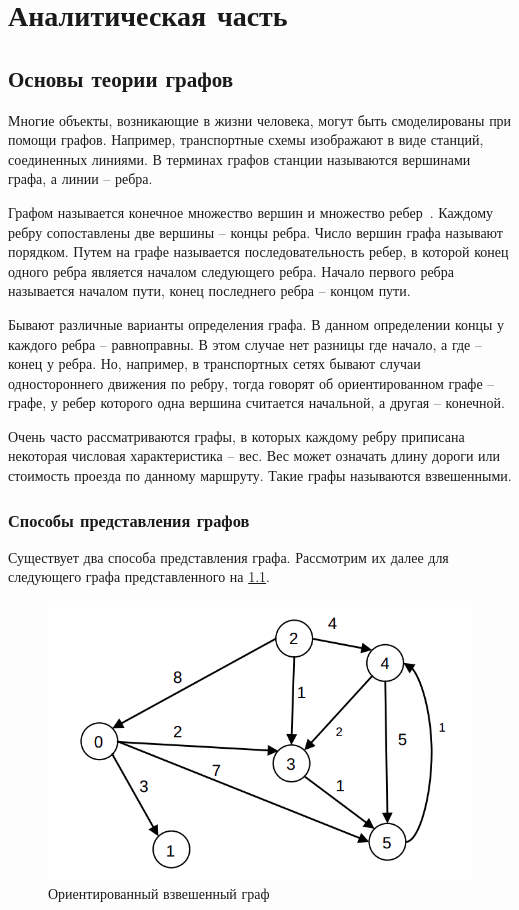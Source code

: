 \chapter{Аналитическая часть}

\section{Основы теории графов}

Многие объекты, возникающие в жизни человека, могут быть смоделированы при помощи графов. Например, транспортные схемы изображают в виде станций, соединенных линиями. В терминах графов станции называются вершинами графа, а линии -- ребра.

Графом называется конечное множество вершин и множество ребер~\cite{graph}. Каждому ребру сопоставлены две вершины -- концы ребра. Число вершин графа называют порядком. Путем на графе называется последовательность ребер, в которой конец одного ребра является началом следующего ребра. Начало первого ребра называется началом пути, конец последнего ребра -- концом пути.

Бывают различные варианты определения графа. В данном определении концы у каждого ребра -- равноправны. В этом случае нет разницы где начало, а где -- конец у ребра. Но, например, в транспортных сетях бывают случаи одностороннего движения по ребру, тогда говорят об ориентированном графе -- графе, у ребер которого одна вершина считается начальной, а другая -- конечной.

Очень часто рассматриваются графы, в которых каждому ребру приписана некоторая числовая характеристика -- вес. Вес может означать длину дороги или стоимость проезда по данному маршруту. Такие графы называются взвешенными.
\pagebreak
\subsection*{Способы представления графов}
Существует два способа представления графа. Рассмотрим их далее для следующего графа представленного на
\ref{img:graph}.
\begin{figure}[H]
	\begin{center}
		\includegraphics[scale=0.5]{images/graph.png}
	\end{center}
	\captionsetup{justification=centering}
	\caption{Ориентированный взвешенный граф}
	\label{img:graph}
\end{figure}

